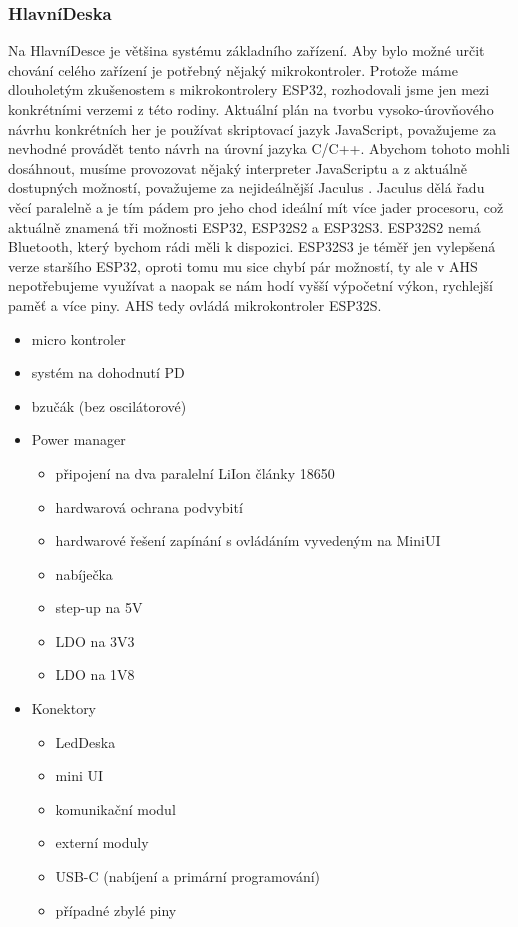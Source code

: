 \subsubsection{HlavníDeska}
Na HlavníDesce je většina systému základního zařízení.
Aby bylo možné určit chování celého zařízení je potřebný nějaký mikrokontroler.
Protože máme dlouholetým zkušenostem s mikrokontrolery ESP32, rozhodovali jsme jen mezi konkrétními verzemi z této rodiny.
Aktuální plán na tvorbu vysoko-úrovňového návrhu konkrétních her je používat skriptovací jazyk JavaScript, považujeme za nevhodné provádět tento návrh na úrovní jazyka C/C++.
Abychom tohoto mohli dosáhnout, musíme provozovat nějaký interpreter JavaScriptu a z aktuálně dostupných možností, považujeme za nejideálnější Jaculus \cite{Jaculus}.
Jaculus dělá řadu věcí paralelně a je tím pádem pro jeho chod ideální mít více jader procesoru, což aktuálně znamená tři možnosti ESP32, ESP32S2 a ESP32S3.
ESP32S2 nemá Bluetooth, který bychom rádi měli k dispozici.
ESP32S3 je téměř jen vylepšená verze staršího ESP32, oproti tomu mu sice chybí pár možností, ty ale v AHS nepotřebujeme využívat a naopak se nám hodí vyšší výpočetní výkon, rychlejší paměť a více piny.
AHS tedy ovládá mikrokontroler ESP32S.




\begin{itemize}
    \item micro kontroler
    \item systém na dohodnutí PD
    \item bzučák (bez oscilátorové)
    \item Power manager
    \begin{itemize}
        \item připojení na dva paralelní LiIon články 18650
        \item hardwarová ochrana podvybití
        \item hardwarové řešení zapínání s ovládáním vyvedeným na MiniUI
        \item nabíječka
        \item step-up na 5V
        \item LDO na 3V3
        \item LDO na 1V8
    \end{itemize}
    \item Konektory
    \begin{itemize}
        \item LedDeska
        \item mini UI
        \item komunikační modul
        \item externí moduly
        \item USB-C (nabíjení a primární programování)
        \item případné zbylé piny
    \end{itemize}
\end{itemize}

